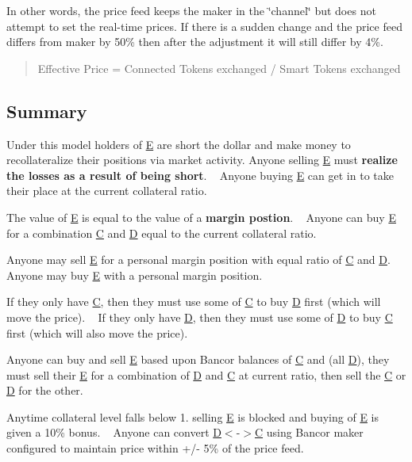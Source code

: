 In other words, the price feed keeps the maker in the \char`\"{}channel\char`\"{} but does not attempt to set the real-\/time prices. If there is a sudden change and the price feed differs from maker by 50\% then after the adjustment it will still differ by 4\%. ~\newline
 \begin{quote}
Effective Price = Connected Tokens exchanged / Smart Tokens exchanged \end{quote}


\subsection*{Summary }

Under this model holders of \mbox{\hyperlink{struct_e}{E}} are short the dollar and make money to recollateralize their positions via market activity. Anyone selling \mbox{\hyperlink{struct_e}{E}} must {\bfseries realize the losses as a result of being short}. ~\newline
Anyone buying \mbox{\hyperlink{struct_e}{E}} can get in to take their place at the current collateral ratio.

The value of \mbox{\hyperlink{struct_e}{E}} is equal to the value of a {\bfseries margin postion}. ~\newline
Anyone can buy \mbox{\hyperlink{struct_e}{E}} for a combination \mbox{\hyperlink{struct_c}{C}} and \mbox{\hyperlink{struct_d}{D}} equal to the current collateral ratio.

Anyone may sell \mbox{\hyperlink{struct_e}{E}} for a personal margin position with equal ratio of \mbox{\hyperlink{struct_c}{C}} and \mbox{\hyperlink{struct_d}{D}}. ~\newline
Anyone may buy \mbox{\hyperlink{struct_e}{E}} with a personal margin position.

If they only have \mbox{\hyperlink{struct_c}{C}}, then they must use some of \mbox{\hyperlink{struct_c}{C}} to buy \mbox{\hyperlink{struct_d}{D}} first (which will move the price). ~\newline
If they only have \mbox{\hyperlink{struct_d}{D}}, then they must use some of \mbox{\hyperlink{struct_d}{D}} to buy \mbox{\hyperlink{struct_c}{C}} first (which will also move the price).

Anyone can buy and sell \mbox{\hyperlink{struct_e}{E}} based upon Bancor balances of \mbox{\hyperlink{struct_c}{C}} and (all \mbox{\hyperlink{struct_d}{D}}), they must sell their \mbox{\hyperlink{struct_e}{E}} for a combination of \mbox{\hyperlink{struct_d}{D}} and \mbox{\hyperlink{struct_c}{C}} at current ratio, then sell the \mbox{\hyperlink{struct_c}{C}} or \mbox{\hyperlink{struct_d}{D}} for the other.

Anytime collateral level falls below 1. selling \mbox{\hyperlink{struct_e}{E}} is blocked and buying of \mbox{\hyperlink{struct_e}{E}} is given a 10\% bonus. ~\newline
Anyone can convert \mbox{\hyperlink{struct_d}{D}}$<$-\/$>$\mbox{\hyperlink{struct_c}{C}} using Bancor maker configured to maintain price within +/-\/ 5\% of the price feed. 